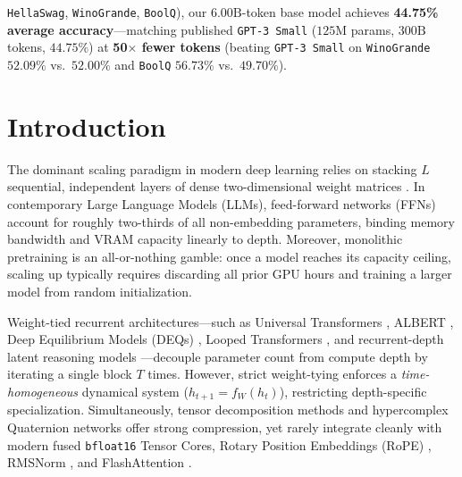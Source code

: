 \documentclass[10pt,twocolumn]{article}
\newcommand{\citep}[1]{\cite{#1}}
\begin{document}
\texttt{HellaSwag}, \texttt{WinoGrande}, \texttt{BoolQ}), our $6.00\text{B}$-token base model achieves \textbf{44.75\% average accuracy}---matching published \texttt{GPT-3 Small} ($125\text{M}$ params, $300\text{B}$ tokens, $44.75\%$) at \textbf{50$\times$ fewer tokens} (beating \texttt{GPT-3 Small} on \texttt{WinoGrande} $52.09\%$ vs.\ $52.00\%$ and \texttt{BoolQ} $56.73\%$ vs.\ $49.70\%$).

\section{Introduction}
The dominant scaling paradigm in modern deep learning relies on stacking $L$ sequential, independent layers of dense two-dimensional weight matrices \citep{vaswani2017attention, radford2019language, kaplan2020scaling, hoffmann2022training}. In contemporary Large Language Models (LLMs), feed-forward networks (FFNs) account for roughly two-thirds of all non-embedding parameters, binding memory bandwidth and VRAM capacity linearly to depth. Moreover, monolithic pretraining is an all-or-nothing gamble: once a model reaches its capacity ceiling, scaling up typically requires discarding all prior GPU hours and training a larger model from random initialization.

Weight-tied recurrent architectures---such as Universal Transformers \citep{dehghani2019universal}, ALBERT \citep{lan2020albert}, Deep Equilibrium Models (DEQs) \citep{bai2019deep}, Looped Transformers \citep{giannou2023looped}, and recurrent-depth latent reasoning models \citep{geiping2025scaling}---decouple parameter count from compute depth by iterating a single block $T$ times. However, strict weight-tying enforces a \emph{time-homogeneous} dynamical system ($h_{t+1} = f_W(h_t)$), restricting depth-specific specialization. Simultaneously, tensor decomposition methods \citep{kolda2009tensor, novikov2015tensorizing} and hypercomplex Quaternion networks \citep{parcollet2019quaternion, tay2019lightweight} offer strong compression, yet rarely integrate cleanly with modern fused \texttt{bfloat16} Tensor Cores, Rotary Position Embeddings (RoPE) \citep{su2024roformer}, RMSNorm \citep{zhang2019root}, and FlashAttention \citep{dao2022flashattention}.
\end{document}
